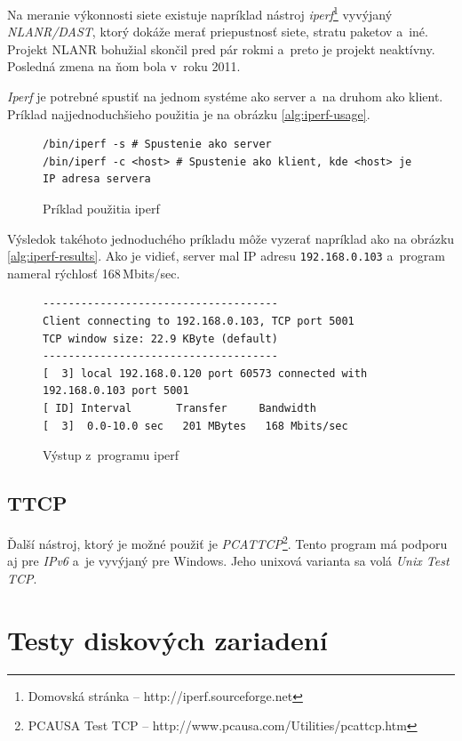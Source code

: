 Na meranie výkonnosti siete existuje napríklad nástroj
\emph{iperf}\footnote{Domovská stránka -- http://iperf.sourceforge.net}
vyvýjaný \emph{NLANR/DAST}, ktorý dokáže merať priepustnosť siete, stratu
paketov a~iné.  Projekt NLANR bohužial skončil pred pár rokmi a~preto je
projekt neaktívny.  Posledná zmena na ňom bola v~roku 2011.

\emph{Iperf} je potrebné spustiť na jednom systéme ako server a~na druhom ako
klient. Príklad najjednoduchšieho použitia je na obrázku \ref{alg:iperf-usage}.

\begin{figure}[H]
\begin{lstlisting}[label=alg:iperf-usage]
/bin/iperf -s # Spustenie ako server
/bin/iperf -c <host> # Spustenie ako klient, kde <host> je IP adresa servera
\end{lstlisting}
\caption{Príklad použitia iperf}
\end{figure}

Výsledok takéhoto jednoduchého príkladu môže vyzerať napríklad ako na obrázku
\ref{alg:iperf-results}. Ako je vidieť, server mal IP adresu
\texttt{192.168.0.103} a~program nameral rýchlosť 168\,Mbits/sec.

\begin{figure}[H]
\begin{lstlisting}[label=alg:iperf-results]
-------------------------------------
Client connecting to 192.168.0.103, TCP port 5001
TCP window size: 22.9 KByte (default)
-------------------------------------
[  3] local 192.168.0.120 port 60573 connected with 192.168.0.103 port 5001
[ ID] Interval       Transfer     Bandwidth
[  3]  0.0-10.0 sec   201 MBytes   168 Mbits/sec
\end{lstlisting}
\caption{Výstup z~programu iperf}
\end{figure}

%
%

\subsection*{TTCP}

Ďalší nástroj, ktorý je možné použiť je \emph{PCATTCP}\footnote{PCAUSA Test TCP
-- http://www.pcausa.com/Utilities/pcattcp.htm}. Tento program má podporu aj
pre \emph{IPv6} a~je vyvýjaný pre Windows. Jeho unixová varianta sa volá
\emph{Unix Test TCP}. 

\section{Testy diskových zariadení}

